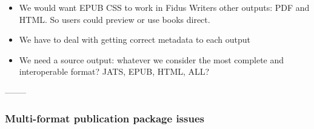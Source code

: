 \documentclass{article}
\begin{document}
\begin{itemize}
\begin{itemize}
\begin{itemize}
\begin{itemize}
\begin{itemize}
\end{itemize}

\end{itemize}

\end{itemize}

\item We would want EPUB CSS to work in Fidus Writers other outputs: PDF and HTML. So users could preview or use books direct. 


\item We have to deal with getting correct metadata to each output


\item We need a source output: whatever we consider the most complete and interoperable format? JATS, EPUB, HTML, ALL?


\end{itemize}

\end{itemize}




--------


\subsubsection{\textbf{Multi-format publication package issues}}\label{H7608727}
\end{document}
